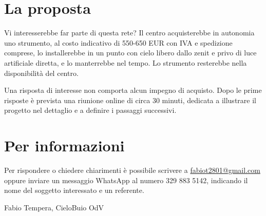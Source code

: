 \documentclass[11pt,a4paper]{report}
\begin{document}
\section*{La proposta}

Vi interesserebbe far parte di questa rete? Il centro acquisterebbe in autonomia uno strumento, al costo indicativo di 550-650 EUR con IVA e spedizione comprese, lo installerebbe in un punto con cielo libero dallo zenit e privo di luce artificiale diretta, e lo manterrebbe nel tempo. Lo strumento resterebbe nella disponibilità del centro.

Una risposta di interesse non comporta alcun impegno di acquisto. Dopo le prime risposte è prevista una riunione online di circa 30 minuti, dedicata a illustrare il progetto nel dettaglio e a definire i passaggi successivi.

\section*{Per informazioni}

Per rispondere o chiedere chiarimenti è possibile scrivere a \url{fabiot2801@gmail.com} oppure inviare un messaggio WhatsApp al numero 329 883 5142, indicando il nome del soggetto interessato e un referente.

\vspace{0.6cm}

\noindent Fabio Tempera, CieloBuio OdV
\end{document}
